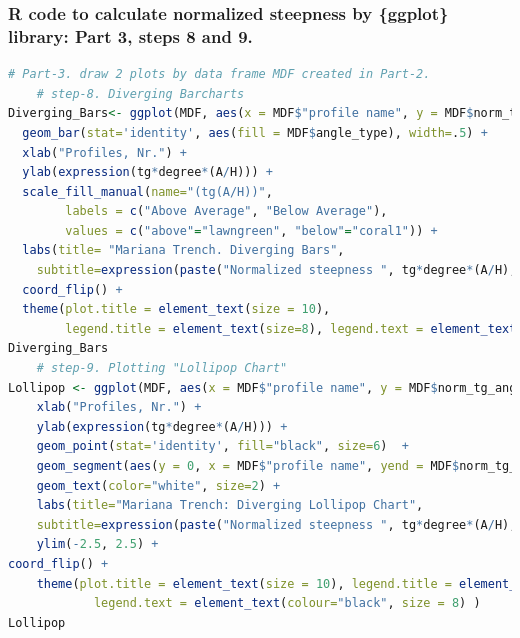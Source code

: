 \documentclass[pdflatex,compress,10pt,
	xcolor={dvipsnames,dvipsnames,svgnames,x11names,table},
	hyperref={colorlinks = true,breaklinks = true, urlcolor = NavyBlue, breaklinks = true}]{beamer}
\begin{document}
\begin{frame}[fragile,shrink=15]\frametitle{R code to calculate normalized steepness by \{ggplot\} library: Part 3, steps 8 and 9.}
\begin{lstlisting}[language=R]
# Part-3. draw 2 plots by data frame MDF created in Part-2.
	# step-8. Diverging Barcharts 
Diverging_Bars<- ggplot(MDF, aes(x = MDF$"profile name", y = MDF$norm_tg_angle, label = MDF$norm_tg_angle)) + 
  geom_bar(stat='identity', aes(fill = MDF$angle_type), width=.5) +
  xlab("Profiles, Nr.") +
  ylab(expression(tg*degree*(A/H))) +
  scale_fill_manual(name="(tg(A/H))", 
        labels = c("Above Average", "Below Average"), 
        values = c("above"="lawngreen", "below"="coral1")) + 
  labs(title= "Mariana Trench. Diverging Bars",
  	subtitle=expression(paste("Normalized steepness ", tg*degree*(A/H), " vs profiles 1:25"))) + 
  coord_flip() +
  theme(plot.title = element_text(size = 10), 
    	legend.title = element_text(size=8), legend.text = element_text(colour="black", size = 8)) 
Diverging_Bars   
	# step-9. Plotting "Lollipop Chart"
Lollipop <- ggplot(MDF, aes(x = MDF$"profile name", y = MDF$norm_tg_angle, label = MDF$norm_tg_angle)) +    
	xlab("Profiles, Nr.") +
	ylab(expression(tg*degree*(A/H))) +
	geom_point(stat='identity', fill="black", size=6)  +   
	geom_segment(aes(y = 0, x = MDF$"profile name", yend = MDF$norm_tg_angle, xend = MDF$"profile name"), color = "black") +   
	geom_text(color="white", size=2) +   
	labs(title="Mariana Trench: Diverging Lollipop Chart",          
	subtitle=expression(paste("Normalized steepness ", tg*degree*(A/H), " vs profiles 1:25"))) +
	ylim(-2.5, 2.5) +   
coord_flip() +
    theme(plot.title = element_text(size = 10), legend.title = element_text(size=8), 
    		legend.text = element_text(colour="black", size = 8) ) 
Lollipop
\end{lstlisting}
\end{frame}
\end{document}

